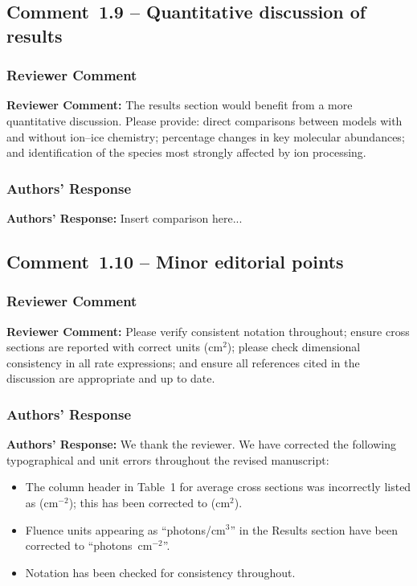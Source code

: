 \documentclass[12pt]{article}
\newcommand{\reviewlabel}{\textbf{\textcolor{commentframe}{Reviewer Comment:}}}
\newcommand{\responselabel}{\textbf{\textcolor{responseframe}{Authors' Response:}}}
\begin{document}
\subsection{Comment~1.9 -- Quantitative discussion of results}

\subsubsection{Reviewer Comment}
\begin{reviewerbox}
\reviewlabel{} The results section would benefit from a more quantitative
discussion. Please provide: direct comparisons between models with and without
ion--ice chemistry; percentage changes in key molecular abundances; and
identification of the species most strongly affected by ion processing.
\end{reviewerbox}

\subsubsection{Authors' Response}
\begin{responsebox}
\responselabel{} Insert comparison here...
\end{responsebox}

\subsection{Comment~1.10 -- Minor editorial points}

\subsubsection{Reviewer Comment}
\begin{reviewerbox}
\reviewlabel{} Please verify consistent notation throughout; ensure cross
sections are reported with correct units (cm$^2$); please check dimensional
consistency in all rate expressions; and ensure all references cited in the
discussion are appropriate and up to date.
\end{reviewerbox}

\subsubsection{Authors' Response}
\begin{responsebox}
\responselabel{} We thank the reviewer. We have corrected the following
typographical and unit errors throughout the revised manuscript:
\begin{itemize}[nosep]
  \item The column header in Table~1 for average cross sections was
        incorrectly listed as (cm$^{-2}$); this has been corrected to
        (cm$^2$).
  \item Fluence units appearing as ``photons/cm$^3$'' in the Results section
        have been corrected to ``photons~cm$^{-2}$''.
  \item Notation has been checked for consistency throughout.
\end{itemize}
\end{responsebox}
\end{document}
